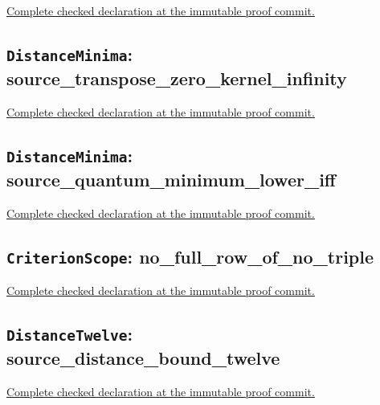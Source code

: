 \noindent\href{https://github.com/alectionary/vibe-math/blob/3ae21c0719cedbd928f4f7882f9b9e266567605e/formalization/distance-preservation/truncated12/DistanceMinima.lean#L28-L31}{Complete checked declaration at the immutable proof commit.}



\subsection*{\texttt{DistanceMinima}: source\_transpose\_zero\_kernel\_infinity}

\noindent\href{https://github.com/alectionary/vibe-math/blob/3ae21c0719cedbd928f4f7882f9b9e266567605e/formalization/distance-preservation/truncated12/DistanceMinima.lean#L40-L51}{Complete checked declaration at the immutable proof commit.}



\subsection*{\texttt{DistanceMinima}: source\_quantum\_minimum\_lower\_iff}

\noindent\href{https://github.com/alectionary/vibe-math/blob/3ae21c0719cedbd928f4f7882f9b9e266567605e/formalization/distance-preservation/truncated12/DistanceMinima.lean#L88-L103}{Complete checked declaration at the immutable proof commit.}



\subsection*{\texttt{CriterionScope}: no\_full\_row\_of\_no\_triple}

\noindent\href{https://github.com/alectionary/vibe-math/blob/3ae21c0719cedbd928f4f7882f9b9e266567605e/formalization/distance-preservation/truncated12/CriterionScope.lean#L12-L17}{Complete checked declaration at the immutable proof commit.}



\subsection*{\texttt{DistanceTwelve}: source\_distance\_bound\_twelve}

\noindent\href{https://github.com/alectionary/vibe-math/blob/3ae21c0719cedbd928f4f7882f9b9e266567605e/formalization/distance-preservation/truncated12/DistanceTwelve.lean#L9-L18}{Complete checked declaration at the immutable proof commit.}


